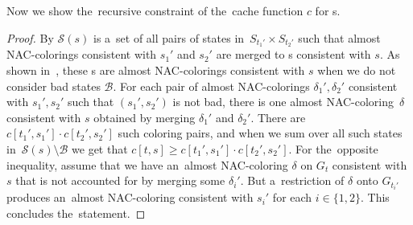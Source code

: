 Now we show the~recursive constraint of the~cache function \( c \) for \JoinNode{}s.
%
%
%
\begin{proof}
	By 
	\( \mathcal{S}(s) \) is a~set of
	all pairs of states in~\( S_{t_1'} \times S_{t_2'} \)
	such that almost NAC-colorings consistent with \( s_1' \) and \( s_2' \)
	are merged to \rbcol{}s consistent with \( s \).
	As shown in~,
	these \rbcol{}s are almost NAC-colorings consistent with \( s \)
	when we do not consider bad states \( \mathcal{B} \).
	For each pair of almost NAC-colorings \( \delta_1', \delta_2' \)
	consistent with \( s_1', s_2' \) such that \( (s_1', s_2') \) is not bad,
	there is one almost NAC-coloring~\( \delta \) consistent with \( s \)
	obtained by merging \( \delta_1' \) and \( \delta_2' \).
	There are \( c[t_1', s_1'] \cdot c[t_2', s_2'] \) such coloring pairs, and
	when we sum over all such states in~\( \mathcal{S}(s) \setminus \mathcal{B} \)
	we get that \( c[t, s] \ge c[t_1', s_1'] \cdot c[t_2', s_2'] \).
	For the~opposite inequality, assume that we have
	an~almost NAC-coloring \( \delta \) on \( G_t \) consistent with \( s \)
	that is not accounted for by merging some \( \delta_i' \).
	But a~restriction of \( \delta \) onto \( G_{t_i'} \) produces an~almost NAC-coloring
	consistent with \( s_i' \) for each \( i \in \{1,2\} \).
	This concludes the~statement.
\end{proof}
%

